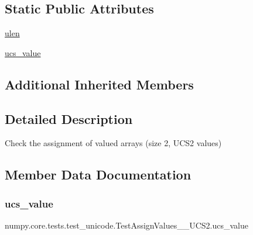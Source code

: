 \subsection*{Static Public Attributes}
\begin{DoxyCompactItemize}
\item 
\hyperlink{classnumpy_1_1core_1_1tests_1_1test__unicode_1_1TestAssignValues__2__UCS2_a061dab6b4d87e8553d6bcef604c585e2}{ulen}
\item 
\hyperlink{classnumpy_1_1core_1_1tests_1_1test__unicode_1_1TestAssignValues__2__UCS2_a140bcd840f5ab70523d6137c1af77e1c}{ucs\+\_\+value}
\end{DoxyCompactItemize}
\subsection*{Additional Inherited Members}


\subsection{Detailed Description}
\begin{DoxyVerb}Check the assignment of valued arrays (size 2, UCS2 values)\end{DoxyVerb}
 

\subsection{Member Data Documentation}
\mbox{\label{classnumpy_1_1core_1_1tests_1_1test__unicode_1_1TestAssignValues__2__UCS2_a140bcd840f5ab70523d6137c1af77e1c}} 
\subsubsection{\texorpdfstring{ucs\+\_\+value}{ucs\_value}}
{\footnotesize\ttfamily numpy.\+core.\+tests.\+test\+\_\+unicode.\+Test\+Assign\+Values\+\_\+\_\+\+U\+C\+S2.\+ucs\+\_\+value\hspace{0.3cm}{\ttfamily [static]}}


